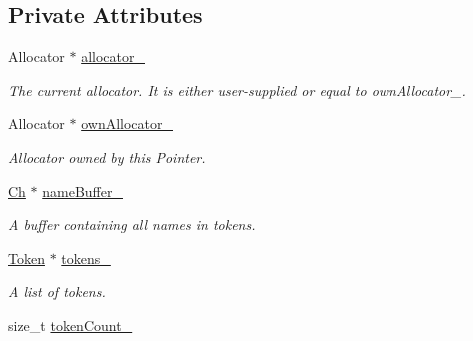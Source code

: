 \subsection*{Private Attributes}
\begin{DoxyCompactItemize}
\item 
Allocator $\ast$ \hyperlink{class_generic_pointer_a331cffeec161b80ea18ac3f1562851bf}{allocator\+\_\+}\hypertarget{class_generic_pointer_a331cffeec161b80ea18ac3f1562851bf}{}\label{class_generic_pointer_a331cffeec161b80ea18ac3f1562851bf}

\begin{DoxyCompactList}\small\item\em The current allocator. It is either user-\/supplied or equal to own\+Allocator\+\_\+. \end{DoxyCompactList}\item 
Allocator $\ast$ \hyperlink{class_generic_pointer_a99b51c07419ee17d57e97774d8ee63ab}{own\+Allocator\+\_\+}\hypertarget{class_generic_pointer_a99b51c07419ee17d57e97774d8ee63ab}{}\label{class_generic_pointer_a99b51c07419ee17d57e97774d8ee63ab}

\begin{DoxyCompactList}\small\item\em Allocator owned by this Pointer. \end{DoxyCompactList}\item 
\hyperlink{class_generic_pointer_a38b73c84d37428340066d907f9d4f37f}{Ch} $\ast$ \hyperlink{class_generic_pointer_a2fd627c663483ad08e4f26707ea5ad86}{name\+Buffer\+\_\+}\hypertarget{class_generic_pointer_a2fd627c663483ad08e4f26707ea5ad86}{}\label{class_generic_pointer_a2fd627c663483ad08e4f26707ea5ad86}

\begin{DoxyCompactList}\small\item\em A buffer containing all names in tokens. \end{DoxyCompactList}\item 
\hyperlink{struct_generic_pointer_1_1_token}{Token} $\ast$ \hyperlink{class_generic_pointer_a997793c66ea1a264089c37c8731eb138}{tokens\+\_\+}\hypertarget{class_generic_pointer_a997793c66ea1a264089c37c8731eb138}{}\label{class_generic_pointer_a997793c66ea1a264089c37c8731eb138}

\begin{DoxyCompactList}\small\item\em A list of tokens. \end{DoxyCompactList}\item 
size\+\_\+t \hyperlink{class_generic_pointer_a7051cf59af6622542a050bd0ff0340f8}{token\+Count\+\_\+}\hypertarget{class_generic_pointer_a7051cf59af6622542a050bd0ff0340f8}{}\label{class_generic_pointer_a7051cf59af6622542a050bd0ff0340f8}


\end{DoxyCompactItemize}
